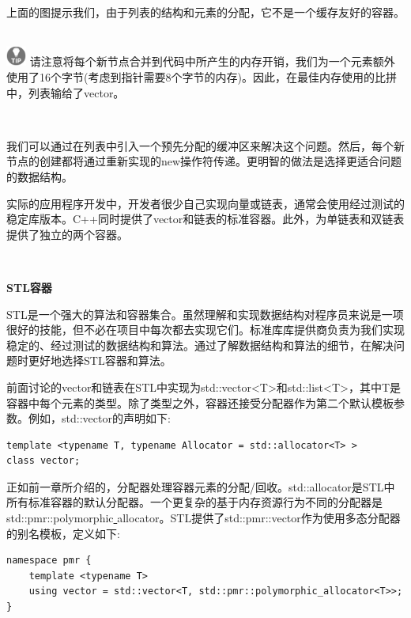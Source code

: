 上面的图提示我们，由于列表的结构和元素的分配，它不是一个缓存友好的容器。 \par

\hspace*{\fill} \\ %
\includegraphics[width=0.05\textwidth]{images/tip}
请注意将每个新节点合并到代码中所产生的内存开销，我们为一个元素额外使用了16个字节(考虑到指针需要8个字节的内存)。因此，在最佳内存使用的比拼中，列表输给了vector。 \par
\noindent\textbf{}\ \par

我们可以通过在列表中引入一个预先分配的缓冲区来解决这个问题。然后，每个新节点的创建都将通过重新实现的new操作符传递。更明智的做法是选择更适合问题的数据结构。 \par
实际的应用程序开发中，开发者很少自己实现向量或链表，通常会使用经过测试的稳定库版本。C++同时提供了vector和链表的标准容器。此外，为单链表和双链表提供了独立的两个容器。 \par

\noindent\textbf{}\ \par
\textbf{STL容器} \ \par
STL是一个强大的算法和容器集合。虽然理解和实现数据结构对程序员来说是一项很好的技能，但不必在项目中每次都去实现它们。标准库库提供商负责为我们实现稳定的、经过测试的数据结构和算法。通过了解数据结构和算法的细节，在解决问题时更好地选择STL容器和算法。 \par
前面讨论的vector和链表在STL中实现为std::vector<T>和std::list<T>，其中T是容器中每个元素的类型。除了类型之外，容器还接受分配器作为第二个默认模板参数。例如，std::vector的声明如下: \par

\begin{lstlisting}[caption={}]
template <typename T, typename Allocator = std::allocator<T> >
class vector;
\end{lstlisting}

正如前一章所介绍的，分配器处理容器元素的分配/回收。std::allocator是STL中所有标准容器的默认分配器。一个更复杂的基于内存资源行为不同的分配器是std::pmr::polymorphic\underline{ }allocator。STL提供了std::pmr::vector作为使用多态分配器的别名模板，定义如下: \par

\begin{lstlisting}[caption={}]
namespace pmr {
	template <typename T>
	using vector = std::vector<T, std::pmr::polymorphic_allocator<T>>;
}
\end{lstlisting}

